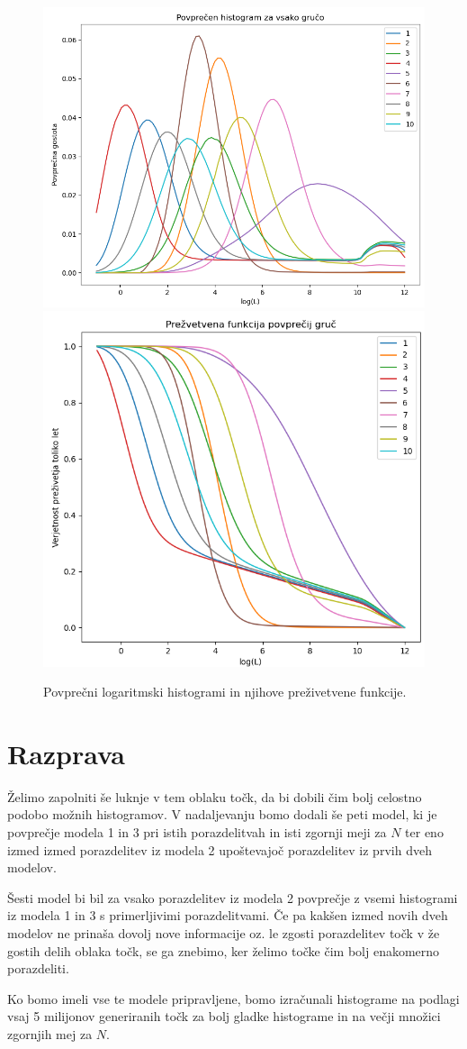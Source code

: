 \documentclass[a4paper]{IEEEtran}
\begin{document}
\begin{figure}
	\centering
	\includegraphics[width=0.49\linewidth]{Figures/log10mean} \includegraphics[width=0.49\linewidth]{Figures/log10surv}
	\caption{Povprečni logaritmski histogrami in njihove preživetvene funkcije.}
	\label{fig:log10clust}
\end{figure}

\section{Razprava}

Želimo zapolniti še luknje v tem oblaku točk, da bi dobili čim bolj celostno podobo možnih histogramov. V nadaljevanju bomo dodali še peti model, ki je povprečje modela 1 in 3 pri istih porazdelitvah in isti zgornji meji za $N$ ter eno izmed izmed porazdelitev iz modela 2 upoštevajoč porazdelitev iz prvih dveh modelov.

Šesti model bi bil za vsako porazdelitev iz modela 2 povprečje z vsemi histogrami iz modela 1 in 3 s primerljivimi porazdelitvami. Če pa kakšen izmed novih dveh modelov ne prinaša dovolj nove informacije oz. le zgosti porazdelitev točk v že gostih delih oblaka točk, se ga znebimo, ker želimo točke čim bolj enakomerno porazdeliti.

Ko bomo imeli vse te modele pripravljene, bomo izračunali histograme na podlagi vsaj 5 milijonov generiranih točk za bolj gladke histograme in na večji množici zgornjih mej za $N$.
\end{document}
